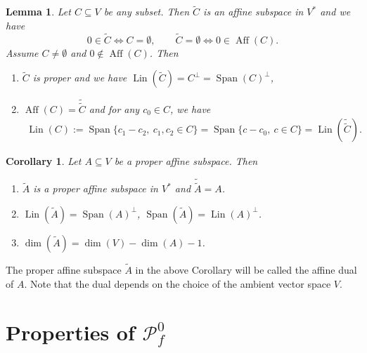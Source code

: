 \documentclass[12pt]{article}
\newtheorem{lemma}{Lemma}
\newtheorem{coro}{Corollary}
\theoremstyle{definition}
\theoremstyle{remark}
\def\aff{\operatorname{Aff}}
\def\lin{\operatorname{Lin}}
\def\Span{\operatorname{Span}}
\def\Pe{\mathcal P}
\begin{document}
\begin{lemma}\label{lemma:dual} Let $C\subseteq V$ be any subset. Then $\tilde C$ is an affine subspace in 
$V^*$ and we have
\[
0\in \tilde C \iff C= \emptyset, \qquad \tilde C=\emptyset\iff 0\in \aff(C).
\]
Assume $C\ne \emptyset$ and $0\notin \aff(C)$. Then
\begin{enumerate}
\item[(i)] $\tilde C$ is proper and we have $\lin(\tilde C)=C^\perp=\Span(C)^\perp$,
\item[(ii)] $\aff(C)=\tilde{\tilde C}$ and for any $c_0\in
C$, we have
\begin{align*}
\lin(C):= \Span\{c_1-c_2,\ c_1,c_2\in C\}=\Span\{c-c_0,\ c\in C\}=\lin(\tilde{\tilde C}).
\end{align*}

\end{enumerate}


\end{lemma}

\begin{coro}\label{coro:dual} Let $A\subseteq V$ be a proper affine subspace. Then 
\begin{enumerate}
\item[(i)] $\tilde A$ is a proper affine subspace in $V^*$ and $\tilde{\tilde A}=A$.
\item[(ii)] $\lin(\tilde A)=\Span(A)^\perp$, $\Span(\tilde A)=\lin(A)^\perp$.
\item[(iii)] $\dim(\tilde A)=\dim(V)-\dim(A)-1$.
\end{enumerate}


\end{coro}

The proper affine subspace $\tilde A$ in the above Corollary will be called the affine dual
of $A$. Note that the dual depends on the choice of the ambient vector space $V$.


\section{Properties of $\Pe_f^0$}
\end{document}
